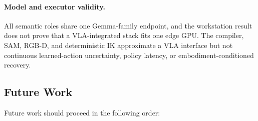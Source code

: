 \paragraph{Model and executor validity.}
All semantic roles share one Gemma-family endpoint, and the workstation result
does not prove that a VLA-integrated stack fits one edge GPU. The compiler,
SAM, RGB-D, and deterministic IK approximate a VLA interface but not continuous
learned-action uncertainty, policy latency, or embodiment-conditioned recovery.

\subsection{Future Work}
\label{subsec:discussion-future-work}

Future work should proceed in the following order:


